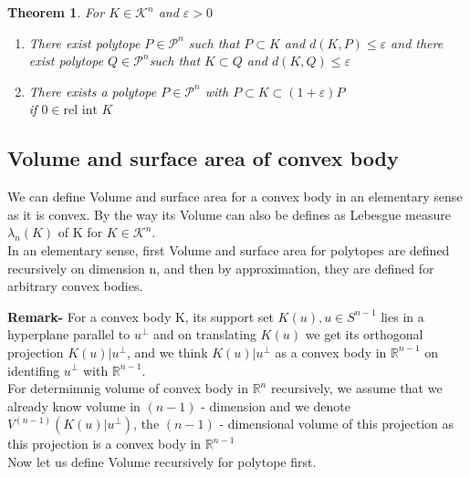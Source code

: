 \documentclass[oneside]{book}
\newtheorem{theorem}{Theorem}[section]
\begin{document}
\begin{theorem}



For  $K \in \mathcal{K}^{n}$ and $\varepsilon>0$ \\

\begin{enumerate}
\item
There exist  polytope $ P  \in \mathcal{P}^{n}$ such that  $P \subset K$ and  $d(K, P) \leq \varepsilon$ \newline 
and \newline
  there exist polytope $Q \in \mathcal{P}^{n}$such that  $K \subset Q$ and $d(K, Q) \leq \varepsilon$ 
\item 
  There exists a polytope $P \in \mathcal{P}^{n}$ with $P \subset K \subset(1+\varepsilon) P$ \\
  if $0 \in \text{rel int } K $ \label{4.1.5}
\end{enumerate}
\end{theorem}















 \subsection{Volume and surface area of convex body}
We can define Volume and surface area for a convex body in an elementary sense as it is convex. By the way its Volume can also be defines as Lebesgue measure $\lambda_{n}(K)$ of K  for $ K \in  \mathcal{K}^{n} $. \\
In an elementary sense, first Volume and surface area for polytopes are defined recursively on dimension n, and then by approximation, they are defined for arbitrary convex bodies. \newline

\textbf{Remark-} 
For a convex body  K, its support set $K(u),u \in S^{n-1} $ lies in a hyperplane parallel to 
$u^{\perp}$ and on translating $K(u)$ we get its orthogonal projection $K(u) | u^{\perp}$, and we think  $K(u) | u^{\perp}$ as a convex body in $\mathbb{R}^{n-1}$  on identifing $u^{\perp}$ with $\mathbb{R}^{n-1}$. \\
  For determimnig volume of convex body in $\mathbb{R}^{n}$ recursively, we assume that we already  know volume in $(n-1)$ - dimension and we denote $V^{(n-1)}\left(K(u) | u^{\perp}\right)$, the $(n-1)$ - dimensional volume of this projection as this projection is a convex body in $\mathbb{R}^{n-1}$ 
\\
Now let us define Volume recursively for polytope first. 
\end{document}
